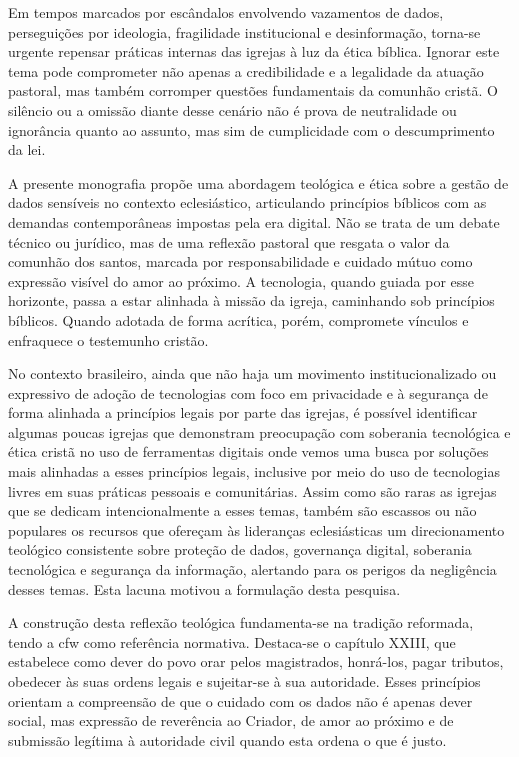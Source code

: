 Em tempos marcados por escândalos envolvendo vazamentos de dados, perseguições por ideologia, fragilidade institucional e desinformação, torna-se urgente repensar práticas internas das igrejas à luz da ética bíblica. Ignorar este tema pode comprometer não apenas a credibilidade e a legalidade da atuação pastoral, mas também corromper questões fundamentais da comunhão cristã. O silêncio ou a omissão diante desse cenário não é prova de neutralidade ou ignorância quanto ao assunto, mas sim de cumplicidade com o descumprimento da lei.

A presente monografia propõe uma abordagem teológica e ética sobre a gestão de dados sensíveis no contexto eclesiástico, articulando princípios bíblicos com as demandas contemporâneas impostas pela era digital. Não se trata de um debate técnico ou jurídico, mas de uma reflexão pastoral que resgata o valor da comunhão dos santos, marcada por responsabilidade e cuidado mútuo como expressão visível do amor ao próximo. A tecnologia, quando guiada por esse horizonte, passa a estar alinhada à missão da igreja, caminhando sob princípios bíblicos. Quando adotada de forma acrítica, porém, compromete vínculos e enfraquece o testemunho cristão.

No contexto brasileiro, ainda que não haja um movimento institucionalizado ou expressivo de adoção de tecnologias com foco em privacidade e à segurança de forma alinhada a princípios legais por parte das igrejas, é possível identificar algumas poucas igrejas que demonstram preocupação com soberania tecnológica e ética cristã no uso de ferramentas digitais onde vemos uma busca por soluções mais alinhadas a esses princípios legais, inclusive por meio do uso de tecnologias livres em suas práticas pessoais e comunitárias. Assim como são raras as igrejas que se dedicam intencionalmente a esses temas, também são escassos ou não populares os recursos que ofereçam às lideranças eclesiásticas um direcionamento teológico consistente sobre proteção de dados, governança digital, soberania tecnológica e segurança da informação, alertando para os perigos da negligência desses temas. Esta lacuna motivou a formulação desta pesquisa.

A construção desta reflexão teológica fundamenta-se na tradição reformada, tendo a \gls{cfw} como referência normativa. Destaca-se o capítulo XXIII, que estabelece como dever do povo orar pelos magistrados, honrá-los, pagar tributos, obedecer às suas ordens legais e sujeitar-se à sua autoridade. Esses princípios orientam a compreensão de que o cuidado com os dados não é apenas dever social, mas expressão de reverência ao Criador, de amor ao próximo e de submissão legítima à autoridade civil quando esta ordena o que é justo.

